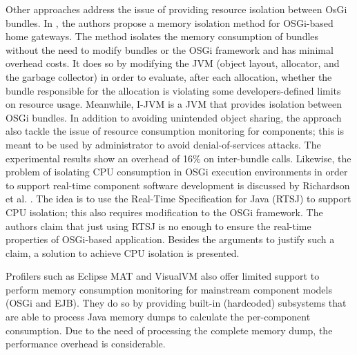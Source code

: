 Other approaches address the issue of providing resource isolation between OsGi bundles.
In \cite{Kuroda2014}, the authors propose a memory isolation method for OSGi-based home gateways.
The method isolates the memory consumption of bundles without the need to modify bundles or the OSGi framework and has minimal overhead costs.
It does so by modifying the JVM (object layout, allocator, and the garbage collector) in order to evaluate, after each allocation, whether the bundle responsible for the allocation is violating some developers-defined limits on resource usage.
Meanwhile, I-JVM \cite{dsn/09/geoffray/ijvm} is a JVM that provides isolation between OSGi bundles.
In addition to avoiding unintended object sharing, the approach also tackle the issue of resource consumption monitoring for components; this is meant to be used by administrator to avoid denial-of-services attacks.
The experimental results show an overhead of 16\% on inter-bundle calls.
Likewise, the problem of isolating CPU consumption in OSGi execution environments in order to support real-time component software development is discussed by Richardson et al. \cite{Richardson2009}.
The idea is to use the Real-Time Specification for Java (RTSJ) to support CPU isolation; this also requires modification to the OSGi framework.
The authors claim that just using RTSJ is no enough to ensure the real-time properties of OSGi-based application.
Besides the arguments to justify such a claim, a solution to achieve CPU isolation is presented.

Profilers such as Eclipse MAT and VisualVM also offer limited support to perform memory consumption monitoring for mainstream component models (OSGi and EJB).
They do so by providing built-in (hardcoded) subsystems that are able to process Java memory dumps to calculate the per-component consumption.
Due to the need of processing the complete memory dump, the performance overhead is considerable. 



